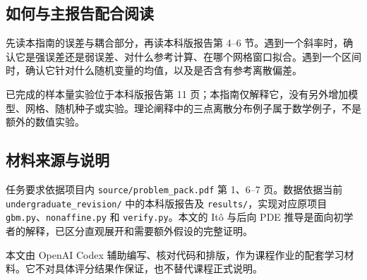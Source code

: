 \documentclass[11pt,a4paper,fontset=none]{ctexart}
\begin{document}
\subsection*{如何与主报告配合阅读}
先读本指南的误差与耦合部分，再读本科版报告第 4--6 节。遇到一个斜率时，确认它是强误差还是弱误差、对什么参考计算、在哪个网格窗口拟合。遇到一个区间时，确认它针对什么随机变量的均值，以及是否含有参考离散偏差。

已完成的样本量实验位于本科版报告第 11 页；本指南仅解释它，没有另外增加模型、网格、随机种子或实验。理论阐释中的三点离散分布例子属于数学例子，不是额外的数值实验。

\subsection*{材料来源与说明}
任务要求依据项目内 \texttt{source/problem\_pack.pdf} 第 1、6--7 页。数据依据当前 \texttt{undergraduate\_\allowbreak revision/} 中的本科版报告及 \texttt{results/}，实现对应原项目 \texttt{gbm.py}、\texttt{nonaffine.py} 和 \texttt{verify.py}。本文的 It\^o 与后向 PDE 推导是面向初学者的解释，已区分直观展开和需要额外假设的完整证明。

本文由 OpenAI Codex 辅助编写、核对代码和排版，作为课程作业的配套学习材料。它不对具体评分结果作保证，也不替代课程正式说明。
\end{document}
